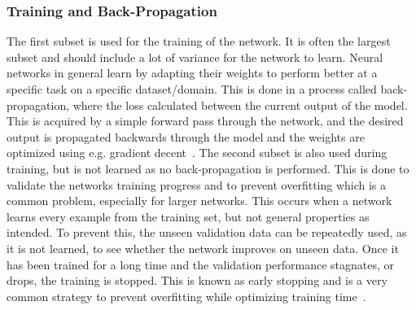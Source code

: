 \subsubsection{Training and Back-Propagation}
The first subset is used for the training of the network. It is often the largest subset and should include a lot of variance for the network to learn. Neural networks in general learn by adapting their weights to perform better at a specific task on a specific dataset/domain. This is done in a process called back-propagation, where the loss calculated between the current output of the model. This is acquired by a simple forward pass through the network, and the desired output is propagated backwards through the model and the weights are optimized using e.g. gradient decent~\cite{CNN2}. The second subset is also used during training, but is not learned as no back-propagation is performed. This is done to validate the networks training progress and to prevent overfitting which is a common problem, especially for larger networks. This occurs when a network learns every example from the training set, but not general properties as intended. To prevent this, the unseen validation data can be repeatedly used, as it is not learned, to see whether the network improves on unseen data. Once it has been trained for a long time and the validation performance stagnates, or drops, the training is stopped. This is known as early stopping and is a very common strategy to prevent overfitting while optimizing training time~\cite{CNN1}.

